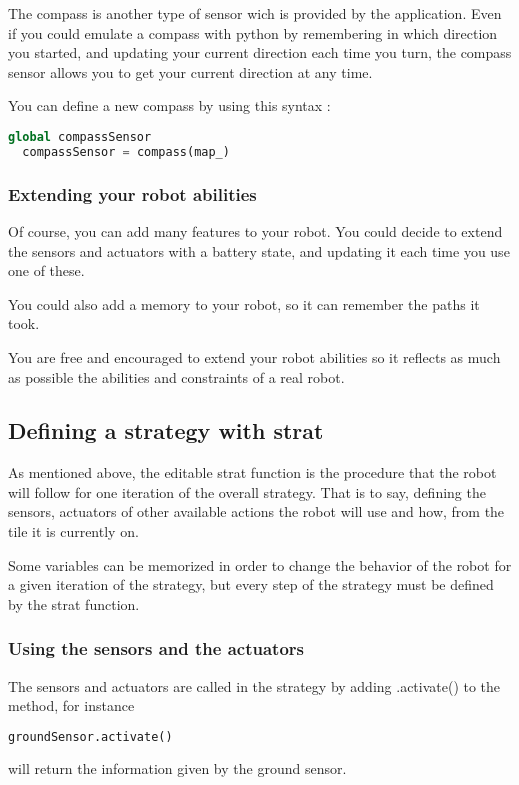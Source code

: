 \documentclass[a4paper,11pt]{article}
\begin{document}
The compass is another type of sensor wich is provided by the
application. Even if you could emulate a compass with python by
remembering in which direction you started, and updating your current
direction each time you turn, the compass sensor allows you to get
your current direction at any time.

You can define a new compass by using this syntax :

\begin{lstlisting}[language=Python]
  global compassSensor
  compassSensor = compass(map_)
\end{lstlisting}


\subsubsection{Extending your robot abilities}

Of course, you can add many features to your robot. You could decide
to extend the sensors and actuators with a battery state, and updating
it each time you use one of these.

You could also add a memory to your robot, so it can remember the
paths it took.

You are free and encouraged to extend your robot abilities so it
reflects as much as possible the abilities and constraints of a real
robot.

\subsection{Defining a strategy with strat}

As mentioned above, the editable strat function is the procedure that
the robot will follow for one iteration of the overall strategy.  That
is to say, defining the sensors, actuators of other available actions
the robot will use and how, from the tile it is currently on.

Some variables can be memorized in order to change the behavior of the
robot for a given iteration of the strategy, but every step of the
strategy must be defined by the strat function.

\subsubsection{Using the sensors and the actuators}

The sensors and actuators are called in the strategy by adding
.activate() to the method, for instance
\begin{lstlisting}[language=Python]
  groundSensor.activate()
\end{lstlisting}
will return the information given by the ground sensor.
\end{document}

